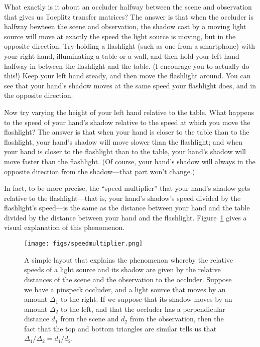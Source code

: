What exactly is it about an occluder halfway between the scene and observation that gives us Toeplitz transfer matrices? The answer is that when the occluder is halfway bewteen the scene and observation, the shadow cast by a moving light source will move at exactly the speed the light source is moving, but in the opposite direction. Try holding a flashlight (such as one from a smartphone) with your right hand, illuminating a table or a wall, and then hold your left hand halfway in between the flashlight and the table. (I encourage you to actually do this!) Keep your left hand steady, and then move the flashlight around. You can see that your hand's shadow moves at the same speed your flashlight does, and in the opposite direction. 

Now try varying the height of your left hand relative to the table. What happens to the speed of your hand's shadow relative to the speed at which you move the flashlight? The answer is that when your hand is closer to the table than to the flashlight, your hand's shadow will move slower than the flashlight; and when your hand is closer to the flashlight than to the table, your hand's shadow will move faster than the flashlight. (Of course, your hand's shadow will always in the opposite direction from the shadow---that part won't change.) 

In fact, to be more precise, the ``speed multiplier'' that your hand's shadow gets relative to the flashlight---that is, your hand's shadow's speed divided by the flashlight's speed---is the same as the distance between your hand and the table divided by the distance between your hand and the flashlight. Figure~\ref{fig:speedmultiplier} gives a visual explanation of this phenomenon.

\begin{figure}
\begin{center}
\texttt{[image: figs/speedmultiplier.png]}
\caption{A simple layout that explains the phenomenon whereby the relative speeds of a light source and its shadow are given by the relative distances of the scene and the observation to the occluder. Suppose we have a pinspeck occluder, and a light source that moves by an amount $\Delta_1$ to the right. If we suppose that its shadow moves by an amount $\Delta_2$ to the left, and that the occluder has a perpendicular distance $d_1$ from the scene and $d_2$ from the observation, then the fact that the top and bottom triangles are similar tells us that $\Delta_1/\Delta_2 = d_1/d_2$. \label{fig:speedmultiplier}}
\end{center}
\end{figure}

